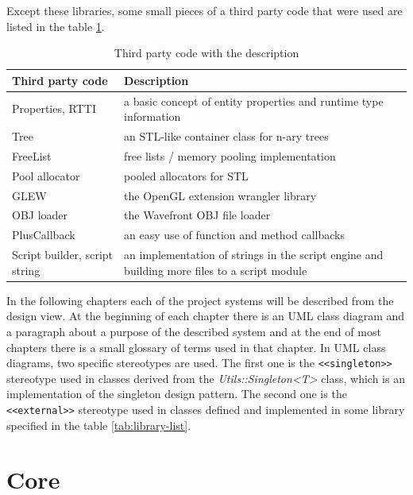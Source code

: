 \documentclass[a4paper, 12pt]{report}
\begin{document}
Except these libraries, some small pieces of a third party code that were used are listed in the table \ref{tab:code-list}.

\begin{table}[htbp]
	\centering
		\begin{tabular}{|p{0.28\hsize}|p{0.65\hsize}|}
			\hline
			Third party code & Description\\
			\hline
			Properties, RTTI\cite{gpg5} & a basic concept of entity properties and runtime type information\\
			Tree\cite{tree} & an STL-like container class for n-ary trees\\
			FreeList\cite{gpg5} & free lists / memory pooling implementation\\
			Pool allocator\cite{allocator} & pooled allocators for STL\\
			GLEW\cite{glew} & the OpenGL extension wrangler library\\
			OBJ loader\cite{objloader} & the Wavefront OBJ file loader\\
			PlusCallback\cite{pluscallback} & an easy use of function and method callbacks\\
			Script builder, script string\cite{angelscript} & an implementation of strings in the script engine and building more files to a script module\\
			\hline
		\end{tabular}
	\caption[Third party code with the description]{Third party code with the description}
	\label{tab:code-list}
\end{table}

In the following chapters each of the project systems will be described from the design view. At the beginning of each chapter there is an UML class diagram and a paragraph about a purpose of the described system and at the end of most chapters there is a small glossary of terms used in that chapter. In UML class diagrams, two specific stereotypes are used. The first one is the \verb/<<singleton>>/ stereotype used in classes derived from the \emph{Utils::Singleton<T>} class, which is an implementation of the singleton design pattern. The second one is the \verb/<<external>>/ stereotype used in classes defined and implemented in some library specified in the table \ref{tab:library-list}.


\chapter{Core}
\end{document}
